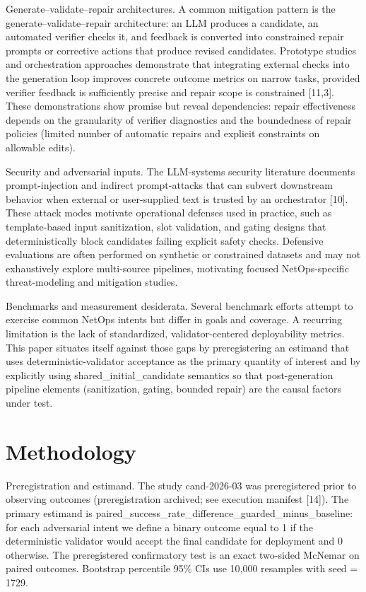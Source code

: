 \documentclass[conference]{IEEEtran}
\begin{document}
Generate--validate--repair architectures. A common mitigation pattern is the generate--validate--repair architecture: an LLM produces a candidate, an automated verifier checks it, and feedback is converted into constrained repair prompts or corrective actions that produce revised candidates. Prototype studies and orchestration approaches demonstrate that integrating external checks into the generation loop improves concrete outcome metrics on narrow tasks, provided verifier feedback is sufficiently precise and repair scope is constrained [11,3]. These demonstrations show promise but reveal dependencies: repair effectiveness depends on the granularity of verifier diagnostics and the boundedness of repair policies (limited number of automatic repairs and explicit constraints on allowable edits).

Security and adversarial inputs. The LLM-systems security literature documents prompt-injection and indirect prompt-attacks that can subvert downstream behavior when external or user-supplied text is trusted by an orchestrator [10]. These attack modes motivate operational defenses used in practice, such as template-based input sanitization, slot validation, and gating designs that deterministically block candidates failing explicit safety checks. Defensive evaluations are often performed on synthetic or constrained datasets and may not exhaustively explore multi-source pipelines, motivating focused NetOps-specific threat-modeling and mitigation studies.

Benchmarks and measurement desiderata. Several benchmark efforts attempt to exercise common NetOps intents but differ in goals and coverage. A recurring limitation is the lack of standardized, validator-centered deployability metrics. This paper situates itself against those gaps by preregistering an estimand that uses deterministic-validator acceptance as the primary quantity of interest and by explicitly using shared\_initial\_candidate semantics so that post-generation pipeline elements (sanitization, gating, bounded repair) are the causal factors under test.

\section{Methodology}
Preregistration and estimand. The study cand-2026-03 was preregistered prior to observing outcomes (preregistration archived; see execution manifest [14]). The primary estimand is paired\_success\_rate\_difference\_guarded\_minus\_baseline: for each adversarial intent we define a binary outcome equal to 1 if the deterministic validator would accept the final candidate for deployment and 0 otherwise. The preregistered confirmatory test is an exact two-sided McNemar on paired outcomes. Bootstrap percentile 95\% CIs use 10,000 resamples with seed = 1729.
\end{document}

